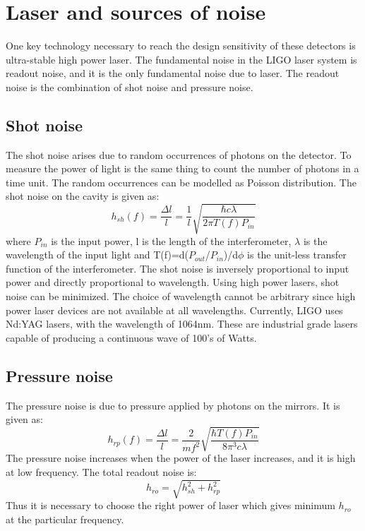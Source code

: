 \documentclass[conference]{IEEEtran}
\begin{document}
\section{Laser and sources of noise}
One key technology necessary to reach the design sensitivity of these detectors is ultra-stable high power laser. The fundamental noise in the LIGO laser system is readout noise, and it is the only fundamental noise due to laser. The readout noise is the combination of shot noise and pressure noise. 

\subsection{Shot noise}
The shot noise arises due to random occurrences of photons on the detector. To measure the power of light is the same thing to count the number of photons in a time unit. The random occurrences can be modelled as  Poisson distribution. The shot noise on the cavity is given as:
\begin{equation}
h_{sh}(f)=\frac{\Delta l}{l}=\frac{1}{l}\sqrt{\frac{\hbar c \lambda}{2\pi T(f)P_{in}}}
\end{equation}
where $P_{in}$ is the input power, l is the length of the interferometer, $\lambda$ is the wavelength of the input light and T(f)=d($P_{out}$/$P_{in}$)/d$\phi$ is the unit-less transfer function of the interferometer. The shot noise is inversely proportional to input power and directly proportional to wavelength. Using high power lasers, shot noise can be minimized. The choice of wavelength cannot be arbitrary since high power laser devices are not available at all wavelengths. Currently, LIGO uses Nd:YAG lasers, with the wavelength of 1064nm. These are industrial grade lasers capable of producing a continuous wave of 100's of Watts. 

\subsection{Pressure noise}
The pressure noise is due to pressure applied by photons on the mirrors. It is given as:
\begin{equation}
h_{rp}(f)=\frac{\Delta l}{l}=\frac{2}{mf^2}\sqrt{\frac{\hbar T(f)P_{in}}{8\pi^3 c\lambda}}
\end{equation}
The pressure noise increases when the power of the laser increases, and it is
high at low frequency. The total readout noise is:
\begin{equation}
h_{ro}=\sqrt{h_{sh}^2 + h_{rp}^2}    
\end{equation}
Thus it is necessary to choose the right power of laser which gives minimum $h_{ro}$ at the particular frequency\cite{article4}.
\end{document}
